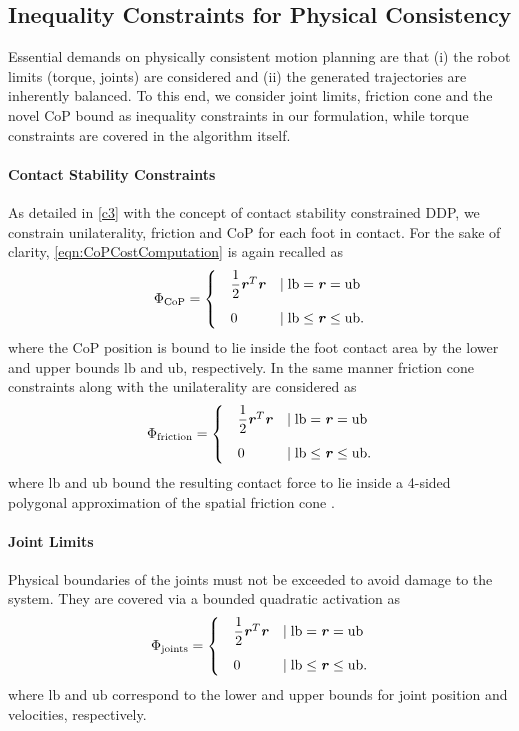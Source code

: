 \subsection{Inequality Constraints for Physical Consistency}
Essential demands on physically consistent motion planning are that (i) the robot limits (torque, joints) are considered and (ii) the generated trajectories are inherently balanced. To this end, we consider joint limits, friction cone and the novel \gls{CoP} bound as inequality constraints in our formulation, while torque constraints are covered in the algorithm itself.

\paragraph{Contact Stability Constraints}
As detailed in \cref{c3} with the concept of contact stability constrained \gls{DDP}, we constrain unilaterality, friction and \gls{CoP} for each foot in contact. For the sake of clarity, \cref{eqn:CoPCostComputation} is again recalled as 
\begin{equation*}
\Phi_{\text{CoP}}=
\begin{cases}
\quad\dfrac{1}{2}\bm{\mathit{r}}^T\bm{\mathit{r}} &\mid \text{lb} = \bm{\mathit{r}} = \text{ub} \\[10pt]
\quad 0 &\mid \text{lb} \leq \bm{\mathit{r}} \leq \text{ub}.
\end{cases}
\end{equation*}
where the \gls{CoP} position is bound to lie inside the foot contact area by the lower and upper bounds $\text{lb}$ and $\text{ub}$, respectively.
In the same manner friction cone constraints along with the unilaterality are considered as
\begin{equation*}
\Phi_{\text{friction}}=
\begin{cases}
\quad\dfrac{1}{2}\bm{\mathit{r}}^T\bm{\mathit{r}} &\mid \text{lb} = \bm{\mathit{r}} = \text{ub} \\[10pt]
\quad 0 &\mid \text{lb} \leq \bm{\mathit{r}} \leq \text{ub}.
\end{cases}
\end{equation*}
where $\text{lb}$ and $\text{ub}$ bound the resulting contact force to lie inside a 4-sided polygonal approximation of the spatial friction cone \cite{kao2016contact}.

\paragraph{Joint Limits}
Physical boundaries of the joints must not be exceeded to avoid damage to the system. They are covered via a bounded quadratic activation as
\begin{equation*}
\Phi_{\text{joints}}=
\begin{cases}
\quad\dfrac{1}{2}\bm{\mathit{r}}^T\bm{\mathit{r}} &\mid \text{lb} = \bm{\mathit{r}} = \text{ub} \\[10pt]
\quad 0 &\mid \text{lb} \leq \bm{\mathit{r}} \leq \text{ub}.
\end{cases}
\end{equation*}
where $\text{lb}$ and $\text{ub}$ correspond to the lower and upper bounds for joint position and velocities, respectively. 

